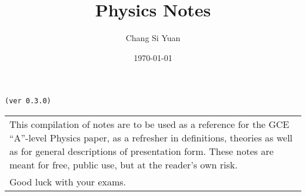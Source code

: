 \documentclass[../main]{subfiles}
\begin{document}
\author{Chang Si Yuan}
\title{Physics Notes}
\date{\today}

\maketitle

\begin{center}

	\texttt{(ver 0.3.0)}

	\vspace{50pt}

	\begin{tabular}{>{\flushleft}p{8cm}}
	This compilation of notes are to be used as a reference for the GCE ``A''-level Physics paper, as a refresher in definitions, theories as well as for general descriptions of presentation form. These notes are meant for free, public use, but at the reader's own risk. \\
	Good luck with your exams.
	\end{tabular}

	\vspace{50pt}

\end{center}

\newpage
\end{document}
